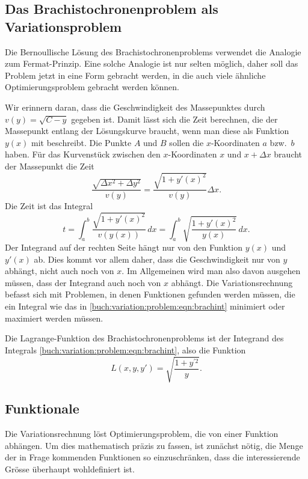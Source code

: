 %
%
\subsection{Das Brachistochronenproblem als Variationsproblem
\label{buch:variation:problem:subsection:variationsproblem}}
Die Bernoullische Lösung des Brachistochronenproblems verwendet die
Analogie zum Fermat-Prinzip.
Eine solche Analogie ist nur selten möglich, daher soll das Problem
jetzt in eine Form gebracht werden, in die auch viele ähnliche
Optimierungsproblem gebracht werden können.

Wir erinnern daran, dass die Geschwindigkeit des Massepunktes durch
$v(y)=\sqrt{C-y}$ gegeben ist.
Damit lässt sich die Zeit berechnen, die der Massepunkt entlang der
Lösungskurve braucht, wenn man diese als Funktion $y(x)$ mit beschreibt.
Die Punkte $A$ und $B$ sollen die $x$-Koordinaten $a$ bzw.~$b$ haben.
Für das Kurvenstück zwischen den $x$-Koordinaten $x$ und $x+\Delta x$
braucht der Massepunkt die Zeit
\[
\frac{ \sqrt{\Delta x^2 + \Delta y^2} }{v(y)}
=
\frac{ \sqrt{1 + y'(x)^2} }{ v(y) } \Delta x.
\]
Die Zeit ist das Integral
\begin{equation}
t
=
\int_a^b \frac{\sqrt{1+y'(x)^2}}{v(y(x))}\,dx
=
\int_a^b \sqrt{\frac{1+y'(x)^2}{y(x)}}\,dx.
\label{buch:variation:problem:eqn:brachint}
\end{equation}
Der Integrand auf der rechten Seite hängt nur von den Funktion $y(x)$
und $y'(x)$ ab.
Dies kommt vor allem daher, dass die Geschwindigkeit nur von $y$ abhängt,
nicht auch noch von $x$.
Im Allgemeinen wird man also davon ausgehen müssen, dass der Integrand
auch noch von $x$ abhängt.
Die Variationsrechnung befasst sich mit Problemen, in denen Funktionen
gefunden werden müssen, die ein Integral wie das in
\eqref{buch:variation:problem:eqn:brachint}
minimiert oder maximiert werden müssen.

\begin{definition}
Die Lagrange-Funk\-tion des Brachistochronenproblems ist der
Integrand des Integrals
\eqref{buch:variation:problem:eqn:brachint},
%
also die Funktion
\[
L(x,y,y')
=
\sqrt{\frac{1+y^{\prime 2}}{y}}.
\]
\end{definition}

%
%
\subsection{Funktionale
\label{buch:variation:problem:subsection:funktionale}}
Die Variationsrechnung löst Optimierungsproblem, die von einer
Funktion abhängen.
Um dies mathematisch präzis zu fassen, ist zunächst nötig, die Menge
der in Frage kommenden Funktionen so einzuschränken, dass die interessierende
Grösse überhaupt wohldefiniert ist.

